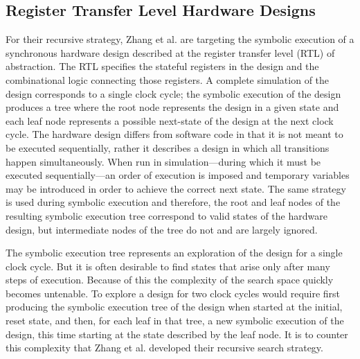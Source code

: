 \subsection{Register Transfer Level Hardware Designs}
For their recursive strategy, Zhang et al. are targeting the symbolic execution
of a synchronous hardware design described at the register transfer level (RTL)
of abstraction. The RTL specifies the stateful registers in the design and the
combinational logic connecting those registers. A complete simulation of the design
corresponds to a single clock cycle; the symbolic execution of the design
produces a tree where the root node represents the design in a given state and
each leaf node represents a possible next-state of the design at the next clock
cycle. The hardware design differs from software code in that it is not meant
to be executed sequentially, rather it describes a design in which all
transitions happen simultaneously. When run in simulation---during which it must
be executed sequentially---an order of execution
is imposed and temporary variables may be introduced in order to achieve the
correct next state. The same strategy is used during symbolic execution and therefore, the root and leaf nodes of the resulting symbolic
execution tree correspond to valid states of the hardware design, but
intermediate nodes of the tree do not and are largely ignored.

The symbolic execution tree represents an exploration of the design for a single
clock cycle. But it is often desirable to find states that arise only after many
steps of execution. Because of this the complexity of the search space quickly
becomes untenable. To explore a design for two clock cycles would require first
producing the symbolic execution tree of the design when started at the initial,
reset state, and then, for each leaf in that tree, a new symbolic execution of
the design, this time starting at the state described by the leaf node. It is to
counter this complexity that Zhang et al. developed their recursive search strategy.






